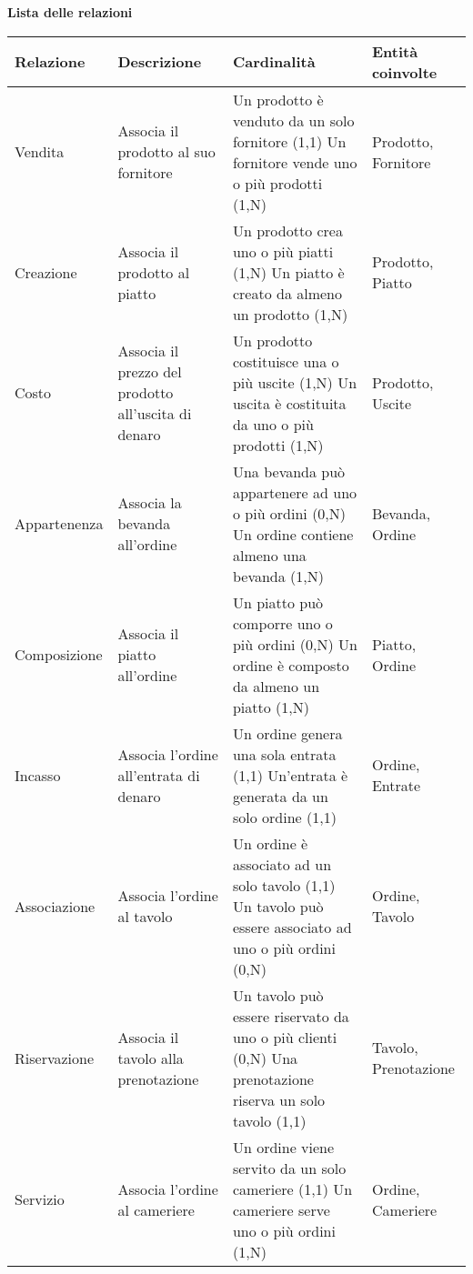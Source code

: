 \textbf{Lista delle relazioni} %
\begin{longtable}{p{2.5cm} p{3cm} p{5.5cm} p{3cm}}
    \midrule
    \textbf{Relazione} & \textbf{Descrizione} & \textbf{Cardinalità} & \textbf{Entità coinvolte} \\ \midrule
    Vendita & Associa il prodotto al suo fornitore & Un prodotto è venduto da un solo fornitore (1,1) \newline Un fornitore vende uno o più prodotti (1,N) & Prodotto, Fornitore \\ \midrule
    Creazione & Associa il prodotto al piatto & Un prodotto crea uno o più piatti (1,N) \newline Un piatto è creato da almeno un prodotto (1,N) & Prodotto, Piatto \\ \midrule
    Costo & Associa il prezzo del prodotto all'uscita di denaro & Un prodotto costituisce una o più uscite (1,N) \newline Un uscita è costituita da uno o più prodotti (1,N) & Prodotto, Uscite \\ \midrule
    Appartenenza & Associa la bevanda all'ordine & Una bevanda può appartenere ad uno o più ordini (0,N) \newline Un ordine contiene almeno una bevanda (1,N) & Bevanda, Ordine \\ \midrule
    Composizione & Associa il piatto all'ordine & Un piatto può comporre uno o più ordini (0,N) \newline Un ordine è composto da almeno un piatto (1,N) & Piatto, Ordine \\ \midrule
    Incasso & Associa l'ordine all'entrata di denaro & Un ordine genera una sola entrata (1,1) \newline Un'entrata è generata da un solo ordine (1,1) & Ordine, Entrate \\ \midrule
    Associazione & Associa l'ordine al tavolo & Un ordine è associato ad un solo tavolo (1,1) \newline Un tavolo può essere associato ad uno o più ordini (0,N) & Ordine, Tavolo \\ \midrule
    Riservazione & Associa il tavolo alla prenotazione & Un tavolo può essere riservato da uno o più clienti (0,N) \newline Una prenotazione riserva un solo tavolo (1,1) & Tavolo, Prenotazione \\ \midrule
    Servizio & Associa l'ordine al cameriere & Un ordine viene servito da un solo cameriere (1,1) \newline Un cameriere serve uno o più ordini (1,N) & Ordine, Cameriere \\ \midrule

\end{longtable}
